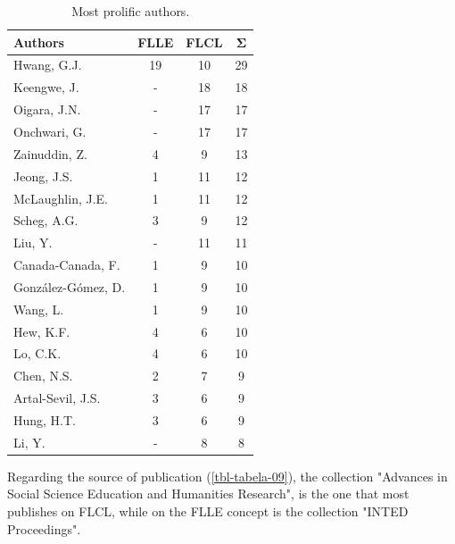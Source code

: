 \documentclass{textolivre-html}
\begin{document}
\begin{table}[htpb]
\caption{Most prolific authors.}
\label{tbl-tabela-08}
\centering
\begin{tabular}{lccc}
\toprule
\textbf{Authors}   & \textbf{FLLE} & \textbf{FLCL} & \textbf{Σ} \\ 
\midrule
Hwang, G.J.        & 19            & 10            & 29         \\ 
Keengwe, J.        & -             & 18            & 18         \\ 
Oigara, J.N.       & -             & 17            & 17         \\ 
Onchwari, G.       & -             & 17            & 17         \\ 
Zainuddin, Z.      & 4             & 9             & 13         \\ 
Jeong, J.S.        & 1             & 11            & 12         \\ 
McLaughlin, J.E.   & 1             & 11            & 12         \\ 
Scheg, A.G.        & 3             & 9             & 12         \\ 
Liu, Y.            & -             & 11            & 11         \\ 
Canada-Canada, F.  & 1             & 9             & 10         \\ 
González-Gómez, D. & 1             & 9             & 10         \\ 
Wang, L.           & 1             & 9             & 10         \\ 
Hew, K.F.          & 4             & 6             & 10         \\ 
Lo, C.K.           & 4             & 6             & 10         \\ 
Chen, N.S.         & 2             & 7             & 9          \\ 
Artal-Sevil, J.S.  & 3             & 6             & 9          \\ 
Hung, H.T.         & 3             & 6             & 9          \\ 
Li, Y.             & -             & 8             & 8          \\ 
\bottomrule
\end{tabular}
\end{table}

Regarding the source of publication (\cref{tbl-tabela-09}), the collection "Advances in Social Science Education and Humanities Research", is the one that most publishes on FLCL, while on the FLLE concept is the collection "INTED Proceedings".
\end{document}
